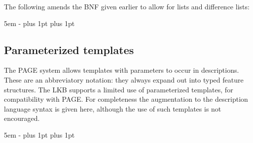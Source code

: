 \documentclass[12pt]{report}
\begin{document}
The following amends the BNF given earlier to allow for lists and difference
lists:
\begin{list}{}
   {\leftmargin 5em
    \itemindent -\leftmargin
    \itemsep 0pt plus 1pt
    \parsep 0pt plus 1pt}
%
%
%
\end{list}

\subsection{Parameterized templates}
\label{templatedesc}

The PAGE system allows templates with parameters to occur in descriptions.
These are an abbreviatory notation: they always expand out into 
typed feature structures.
The LKB supports a limited use of parameterized
templates, for compatibility with PAGE.
For completeness the augmentation to the description language
syntax is given here, although the use of such templates
is not encouraged.  

\begin{list}{}
   {\leftmargin 5em
    \itemindent -\leftmargin
    \itemsep 0pt plus 1pt
    \parsep 0pt plus 1pt}
\end{list}
\end{document}
